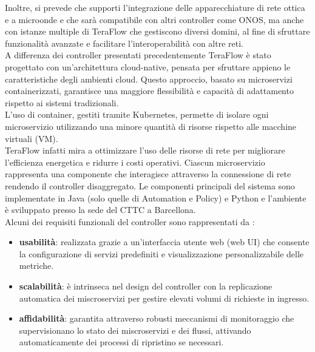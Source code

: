 Inoltre, si prevede che supporti l'integrazione delle 
apparecchiature di rete ottica e a microonde e che sarà compatibile con altri controller come ONOS, ma anche con istanze multiple di TeraFlow che gestiscono diversi domini, al fine di sfruttare funzionalità avanzate e facilitare l'interoperabilità con altre reti.
\\A differenza dei controller presentati precedentemente TeraFlow è stato progettato con un'architettura cloud-native, pensata per sfruttare appieno le caratteristiche degli ambienti cloud.
Questo approccio, basato su microservizi containerizzati, garantisce una maggiore flessibilità e capacità di adattamento rispetto ai sistemi tradizionali.
\\L'uso di container, gestiti tramite Kubernetes, permette di isolare ogni microservizio utilizzando una minore quantità di risorse rispetto alle macchine virtuali (VM).
\\TeraFlow infatti mira a ottimizzare l'uso delle risorse di rete per migliorare l'efficienza energetica e ridurre i costi operativi.
Ciascun microservizio rappresenta una componente che interagisce attraverso la connessione di rete rendendo il controller disaggregato.
Le componenti principali del sistema sono implementate in Java (solo quelle di Automation e Policy) e Python e l'ambiente è sviluppato presso la sede del CTTC a Barcellona. 
\\Alcuni dei requisiti funzionali del controller sono rappresentati da \cite{D22}:
\begin{itemize} 
    \item \textbf{usabilità}: realizzata grazie a un'interfaccia utente web (web UI) che consente la configurazione di servizi predefiniti e visualizzazione personalizzabile delle metriche.
    \item \textbf{scalabilità}: è intrinseca nel design del controller con la replicazione automatica dei miscroservizi per gestire elevati volumi di richieste in ingresso.
    \item \textbf{affidabilità}: garantita attraverso robusti meccanismi di monitoraggio che supervisionano lo stato dei miscroservizi e dei flussi, attivando automaticamente dei processi di ripristino se necessari.
\end{itemize}
